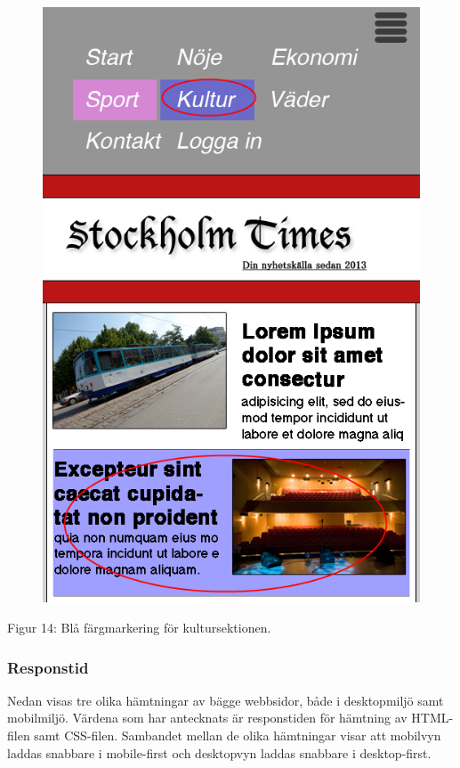 \documentclass[11pt]{article}
\begin{document}
\begin{figure}[H]
{\includegraphics[scale=0.3]{pics/fargmobil.png}%
}
\end{figure}
\hspace{0.5cm}Figur 14: Blå färgmarkering för kultursektionen.


\subsubsection{Responstid}

Nedan visas tre olika hämtningar av bägge webbsidor, både i desktopmiljö samt mobilmiljö. Värdena som har antecknats är responstiden för hämtning av HTML-filen samt CSS-filen. Sambandet mellan de olika hämtningar visar att mobilvyn laddas snabbare i mobile-first och desktopvyn laddas snabbare i desktop-first.
\end{document}
